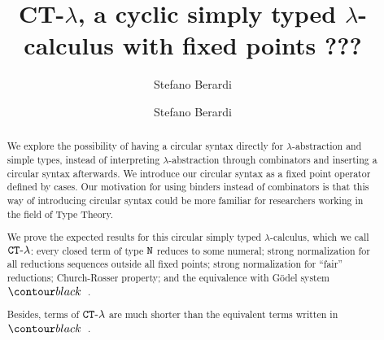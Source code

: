 \ifdraft

\title{CT-$\lambda$, a cyclic simply typed $\lambda$-calculus with fixed points}

\author{Stefano Berardi }
\date{}

\else

\title[Equivalence]
{
???
}

\author[S. Berardi]{Stefano Berardi}
\address{Universit\`{a} di Torino,
Torino, Italy}


\fi

\maketitle

\begin{abstract}
We explore the possibility of having a circular syntax
directly for $\lambda$-abstraction and simple types, instead of interpreting
 $\lambda$-abstraction through combinators and inserting a  circular syntax afterwards.
We introduce our circular syntax as a fixed point operator defined by cases.
Our motivation for using binders instead of combinators is that this way of introducing circular syntax 
could be more familiar for researchers working in the field of Type Theory.

We prove the expected results for this circular simply typed $\lambda$-calculus, which we call ${ {\tt CT} \mbox{-} \lambda}$: 
every closed term of type ${\tt N}$ reduces to some numeral;
strong normalization for all reductions sequences outside all fixed points; 
 strong normalization for ``fair'' reductions; Church-Rosser property;
and the equivalence with G\"{o}del system $\systemT$. 

Besides, terms of ${ {\tt CT} \mbox{-} \lambda}$ are much shorter than the equivalent terms written in $\systemT$. 
\end{abstract}

\iffalse
key words: 
proof theory,
inductive definitions,
Brotherston-Simpson conjecture,
cyclic proofs,
Martin-Lof's system of inductive definitions,
infinite Ramsey theorem
Podelski-Rybalchenko termination theorem
size-change termination theorem
\fi
